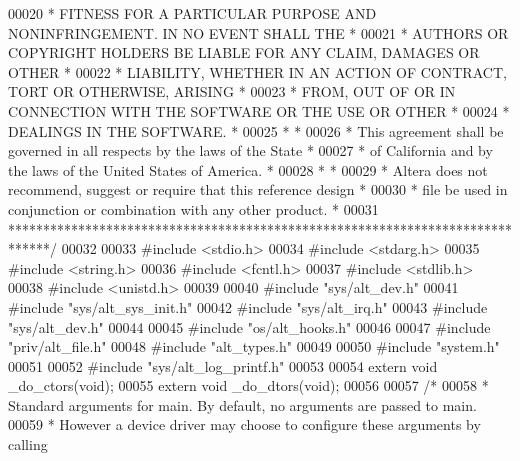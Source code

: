 \begin{DoxyCode}
00020 \textcolor{comment}{* FITNESS FOR A PARTICULAR PURPOSE AND NONINFRINGEMENT. IN NO EVENT SHALL THE *}
00021 \textcolor{comment}{* AUTHORS OR COPYRIGHT HOLDERS BE LIABLE FOR ANY CLAIM, DAMAGES OR OTHER      *}
00022 \textcolor{comment}{* LIABILITY, WHETHER IN AN ACTION OF CONTRACT, TORT OR OTHERWISE, ARISING     *}
00023 \textcolor{comment}{* FROM, OUT OF OR IN CONNECTION WITH THE SOFTWARE OR THE USE OR OTHER         *}
00024 \textcolor{comment}{* DEALINGS IN THE SOFTWARE.                                                   *}
00025 \textcolor{comment}{*                                                                             *}
00026 \textcolor{comment}{* This agreement shall be governed in all respects by the laws of the State   *}
00027 \textcolor{comment}{* of California and by the laws of the United States of America.              *}
00028 \textcolor{comment}{*                                                                             *}
00029 \textcolor{comment}{* Altera does not recommend, suggest or require that this reference design    *}
00030 \textcolor{comment}{* file be used in conjunction or combination with any other product.          *}
00031 \textcolor{comment}{******************************************************************************/}
00032 
00033 \textcolor{preprocessor}{#include <stdio.h>}
00034 \textcolor{preprocessor}{#include <stdarg.h>}
00035 \textcolor{preprocessor}{#include <string.h>}
00036 \textcolor{preprocessor}{#include <fcntl.h>}
00037 \textcolor{preprocessor}{#include <stdlib.h>}
00038 \textcolor{preprocessor}{#include <unistd.h>}
00039 
00040 \textcolor{preprocessor}{#include "sys/alt_dev.h"}
00041 \textcolor{preprocessor}{#include "sys/alt_sys_init.h"}
00042 \textcolor{preprocessor}{#include "sys/alt_irq.h"}
00043 \textcolor{preprocessor}{#include "sys/alt_dev.h"}
00044 
00045 \textcolor{preprocessor}{#include "os/alt_hooks.h"}
00046 
00047 \textcolor{preprocessor}{#include "priv/alt_file.h"}
00048 \textcolor{preprocessor}{#include "alt_types.h"}
00049 
00050 \textcolor{preprocessor}{#include "system.h"}
00051 
00052 \textcolor{preprocessor}{#include "sys/alt_log_printf.h"}
00053 
00054 \textcolor{keyword}{extern} \textcolor{keywordtype}{void} _do_ctors(\textcolor{keywordtype}{void});
00055 \textcolor{keyword}{extern} \textcolor{keywordtype}{void} _do_dtors(\textcolor{keywordtype}{void});
00056 
00057 \textcolor{comment}{/*}
00058 \textcolor{comment}{ * Standard arguments for main. By default, no arguments are passed to main.}
00059 \textcolor{comment}{ * However a device driver may choose to configure these arguments by calling}

\end{DoxyCode}

